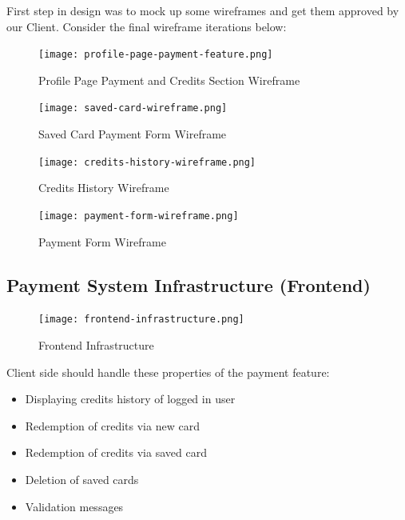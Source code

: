 First step in design was to mock up some wireframes and get them approved by our Client. Consider the final wireframe iterations below:\\

\begin{figure}[!hbt]
  	\centering
 	\texttt{[image: profile-page-payment-feature.png]}
  	\caption{Profile Page Payment and Credits Section Wireframe}
 	\label{fig:profile-wireframe}
\end{figure}

\begin{figure}[!hbt]
  	\centering
 	\texttt{[image: saved-card-wireframe.png]}
  	\caption{Saved Card Payment Form Wireframe}
 	\label{fig:saved-card-wireframe}
\end{figure}

\begin{figure}[!hbt]
  	\centering
 	\texttt{[image: credits-history-wireframe.png]}
  	\caption{Credits History Wireframe}
 	\label{fig:credits-history-wireframe}
\end{figure}

\begin{figure}[!hbt]
  	\centering
 	\texttt{[image: payment-form-wireframe.png]}
  	\caption{Payment Form Wireframe}
 	\label{fig:payment-form-wireframe}
\end{figure}

\subsection{Payment System Infrastructure (Frontend)}
\label{subsec:payment-system-infrastructure}

\begin{figure}[!hbt]
  	\centering
 	\texttt{[image: frontend-infrastructure.png]}
  	\caption{Frontend Infrastructure}
 	\label{fig:frontend-infrastructure-diagram}
\end{figure}

Client side should handle these properties of the payment feature:

\begin{itemize}
\item Displaying credits history of logged in user
\item Redemption of credits via new card
\item Redemption of credits via saved card
\item Deletion of saved cards
\item Validation messages
\end{itemize}


